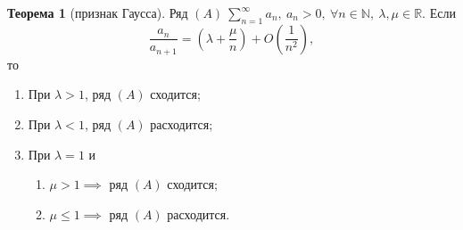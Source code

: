 \documentclass{report}
\theoremstyle{definition}
\newtheorem{theorem}{Теорема}[section]
\begin{document}
\begin{theorem}[признак Гаусса]
  Ряд $(A) \ \sum_{n=1}^{\infty} a_n, \ a_n > 0, \ \forall n \in \mathbb{N}, \ \lambda, \mu \in \mathbb{R}$. Если
  \begin{equation*}
    \frac{a_n}{a_{n+1}} = (\lambda + \frac{\mu}{n}) + O(\frac{1}{n^2}),
  \end{equation*}
  то
  \begin{enumerate}
    \item При $\lambda > 1$, ряд $(A)$ сходится;
    \item При $\lambda < 1$, ряд $(A)$ расходится;
    \item При $\lambda = 1$ и \begin{enumerate}
            \item $\mu > 1 \implies$ ряд $(A)$ сходится;
            \item $\mu \leqslant 1 \implies$ ряд $(A)$ расходится.
          \end{enumerate}
  \end{enumerate}
\end{theorem}
\end{document}
